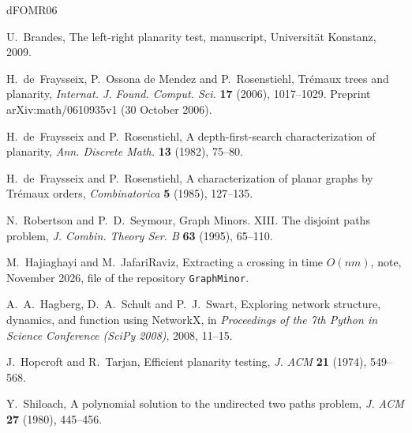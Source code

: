\documentclass[11pt]{article}
\begin{document}
{\small
\begin{thebibliography}{dFOMR06}

U.~Brandes,
The left-right planarity test,
manuscript, Universit\"at Konstanz, 2009.

H.~de~Fraysseix, P.~Ossona de Mendez and P.~Rosenstiehl,
Tr\'emaux trees and planarity,
\emph{Internat. J. Found. Comput. Sci.} \textbf{17} (2006), 1017--1029.
Preprint arXiv:math/0610935v1 (30 October 2006).

H.~de~Fraysseix and P.~Rosenstiehl,
A depth-first-search characterization of planarity,
\emph{Ann. Discrete Math.} \textbf{13} (1982), 75--80.

H.~de~Fraysseix and P.~Rosenstiehl,
A characterization of planar graphs by Tr\'emaux orders,
\emph{Combinatorica} \textbf{5} (1985), 127--135.

N.~Robertson and P.~D.~Seymour,
Graph Minors. XIII. The disjoint paths problem,
\emph{J. Combin. Theory Ser. B} \textbf{63} (1995), 65--110.

M.~Hajiaghayi and M.~JafariRaviz,
Extracting a crossing in time $O(nm)$,
note, November 2026, file  of the
repository \texttt{GraphMinor}.

A.~A.~Hagberg, D.~A.~Schult and P.~J.~Swart,
Exploring network structure, dynamics, and function using NetworkX,
in \emph{Proceedings of the 7th Python in Science Conference (SciPy 2008)},
2008, 11--15.

J.~Hopcroft and R.~Tarjan,
Efficient planarity testing,
\emph{J. ACM} \textbf{21} (1974), 549--568.

Y.~Shiloach,
A polynomial solution to the undirected two paths problem,
\emph{J. ACM} \textbf{27} (1980), 445--456.

\end{thebibliography}}
\end{document}
